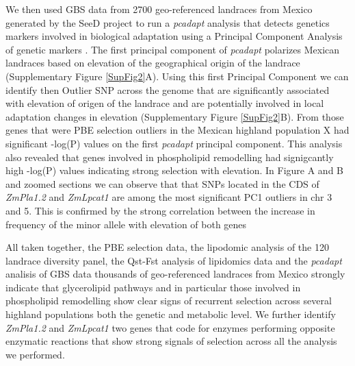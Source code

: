 \documentclass[9pt,twocolumn,twoside,lineno]{gsajnl}
\begin{document}
We then used GBS data from 2700 geo-referenced landraces from Mexico generated by the SeeD project \citep{Romero_Navarro2017-cn, Gates2019-xu} to run a \textit{pcadapt} analysis that detects genetics markers involved in biological adaptation using a Principal Component Analysis of genetic markers \cite{Luu2017-ws}. The first principal component of \textit{pcadapt} polarizes Mexican landraces based on elevation of the geographical origin of the landrace (Supplementary Figure \ref{SupFig2}A). Using this first Principal Component we can identify then Outlier SNP across the genome that are significantly associated with elevation of origen of the landrace and are potentially involved in local adaptation changes in elevation (Supplementary Figure \ref{SupFig2}B). 
From those genes that were PBE selection outliers in the Mexican highland population X had significant -log(P) values on the first \textit{pcadapt} principal component. This analysis also revealed that genes involved in phospholipid remodelling had signigcantly high -log(P) values indicating strong selection with elevation. In Figure A and B and zoomed sections we can observe that that SNPs located in the CDS of \textit{ZmPla1.2} and \textit{ZmLpcat1} are among the most significant PC1 outliers in chr 3 and 5. This is confirmed by the strong correlation between the increase in frequency of the minor allele with elevation of both genes       

All taken together, the PBE selection data, the lipodomic analysis of the 120 landrace diversity panel, the Qst-Fst analysis of lipidomics data and the \textit{pcadapt} analisis of GBS data thousands of geo-referenced landraces from Mexico strongly indicate that glycerolipid pathways and in particular those involved in phospholipid remodelling show clear signs of recurrent selection across several highland populations both the genetic and metabolic level. We further identify \textit{ZmPla1.2} and \textit{ZmLpcat1} two genes that code for enzymes performing opposite enzymatic reactions that show strong signals of selection across all the analysis we performed.   
\end{document}
